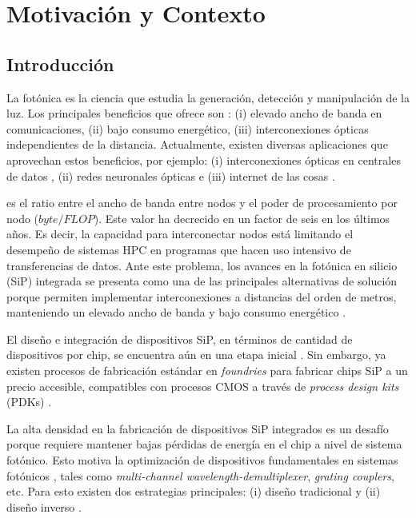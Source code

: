 \chapter{Motivación y Contexto}\label{chapter:introduction}

\section{Introducción}

La fotónica es la ciencia que estudia la generación, detección y manipulación de la luz. 
Los principales beneficios que ofrece son \citep{Shen2019}:
(i) elevado ancho de banda en comunicaciones, 
(ii) bajo consumo energético,
(iii) interconexiones ópticas independientes de la distancia.
Actualmente, existen diversas aplicaciones que aprovechan estos beneficios, por ejemplo:
(i) interconexiones ópticas en centrales de datos \citep{Shen2019},
(ii) redes neuronales ópticas \citep{Shen2017} e
(iii) internet de las cosas \citep{Li2021}.


es el ratio entre el ancho de banda entre nodos y el poder de procesamiento por nodo ($byte / FLOP$).
Este valor ha decrecido en un factor de seis en los últimos años.
Es decir, la capacidad para interconectar nodos está
limitando el desempeño de sistemas HPC en programas que hacen uso intensivo de transferencias de datos.
Ante este problema, los avances en la fotónica en silicio (SiP) integrada se presenta como una de las
principales alternativas de solución porque permiten implementar interconexiones a distancias del orden de metros,
manteniendo un elevado ancho de banda y bajo consumo energético \citep{Shen2019, Anderson2018}.

El diseño e integración de dispositivos SiP, en términos
de cantidad de dispositivos por chip, se encuentra aún en una etapa inicial
\citep{LukasChrostowski2010, Glick2018}.
Sin embargo, ya existen procesos de fabricación estándar en \emph{foundries}
para fabricar chips SiP a un precio accesible, compatibles con procesos CMOS
a través de \emph{process design kits} (PDKs) \citep{Bogaerts2018}.

La alta densidad en la fabricación de dispositivos SiP integrados es un desafío porque requiere mantener bajas pérdidas de energía en el chip a nivel de sistema fotónico. Esto motiva la optimización de dispositivos fundamentales en sistemas fotónicos \citep{Vuckovic2019}, tales como 
 \emph{multi-channel wavelength-demultiplexer}, \emph{grating couplers}, etc.
Para esto existen dos estrategias principales: (i) diseño tradicional
\citep{Hughes2016, Song2008, Huang2018} y (ii) diseño inverso \citep{Malheiros-Silveira2020, Gregory2015, Su2020}.


